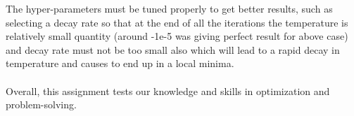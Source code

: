 \documentclass[titlepage, 11pt]{article}
\begin{document}
The hyper-parameters must be tuned properly to get better results, such as selecting a decay rate so that at the end of all
the iterations the temperature is relatively small quantity (around -1e-5 was giving perfect result for above case) and decay rate must
not be too small also which will lead to a rapid decay in temperature and causes to end up in a local minima.
\\
\\
Overall, this assignment tests our knowledge and skills in optimization and problem-solving.



% 
% 
\end{document}
